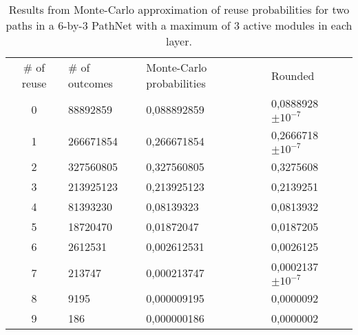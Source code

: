 \begin{table}[ht]
    \centering
    \begin{tabular}{clll}
    \# of reuse & \# of outcomes & Monte-Carlo probabilities & Rounded  \\
    0           & 88892859      & 0,088892859               & 0,0888928 \(\pm 10^{-7}\)  \\
    1           & 266671854     & 0,266671854               & 0,2666718 \(\pm 10^{-7}\)  \\
    2           & 327560805     & 0,327560805               & 0,3275608                  \\
    3           & 213925123     & 0,213925123               & 0,2139251                  \\
    4           & 81393230      & 0,08139323                & 0,0813932                  \\
    5           & 18720470      & 0,01872047                & 0,0187205                  \\
    6           & 2612531       & 0,002612531               & 0,0026125                  \\
    7           & 213747        & 0,000213747               & 0,0002137 \(\pm 10^{-7}\)  \\
    8           & 9195          & 0,000009195               & 0,0000092                  \\
    9           & 186           & 0,000000186               & 0,0000002                 
    \end{tabular}
    \caption[Monte-Carlo predictions for Relearning experiment]{Results from Monte-Carlo approximation of reuse probabilities for two paths in a 6-by-3 PathNet with a maximum of 3 active modules in each layer.}
    \label{tab:montecarlo}
\end{table}